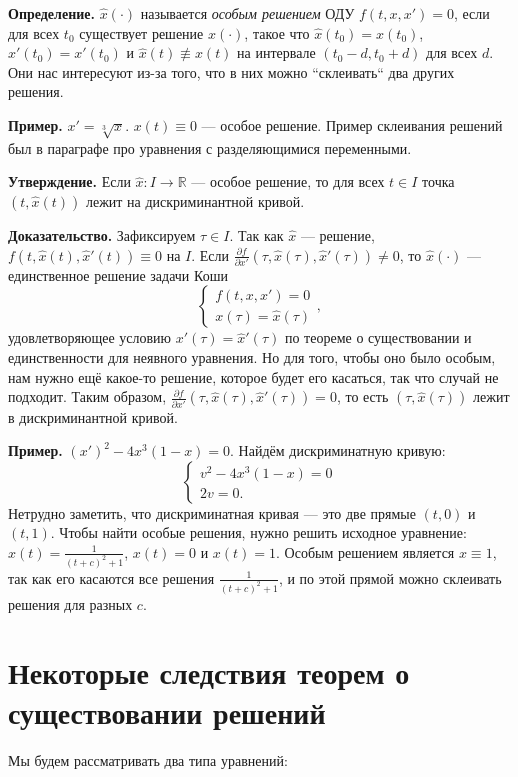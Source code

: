 \textbf{Определение.} $\widehat{x}(\cdot)$ называется \textit{особым решением} ОДУ $f(t, x, x') = 0$, если для всех $t_0$ существует решение $x(\cdot)$, такое что $\widehat{x}(t_0) = x(t_0)$, $\widehat{x}'(t_0) = x'(t_0)$ и $\widehat{x}(t) \not\equiv x(t)$ на интервале $(t_0 - d, t_0 + d)$ для всех $d$.
Они нас интересуют из-за того, что в них можно ``склеивать`` два других решения.

\textbf{Пример.} $x' = \sqrt[3]{x}$. $x(t) \equiv 0$ --- особое решение.
Пример склеивания решений был в параграфе про уравнения с разделяющимися переменными.

\textbf{Утверждение.} Если $\widehat{x}: I \to \mathbb R$ --- особое решение, то для всех $t \in I$ точка $(t, \widehat{x}(t))$ лежит на дискриминантной кривой.

\textbf{Доказательство.} Зафиксируем $\tau \in I$. Так как $\widehat x$ --- решение, $f(t, \widehat x(t), \widehat x'(t)) \equiv 0$ на $I$.
Если $\frac{\partial f}{\partial x'} (\tau, \widehat x(\tau), \widehat x'(\tau)) \ne 0$, то $\widehat x(\cdot)$ --- единственное решение задачи Коши
\[
    \begin{cases}
        f(t, x, x') = 0 \\
        x(\tau) = \widehat x(\tau)
    \end{cases},
\]
удовлетворяющее условию $x'(\tau) = \widehat x'(\tau)$ по теореме о существовании и единственности для неявного уравнения.
Но для того, чтобы оно было особым, нам нужно ещё какое-то решение, которое будет его касаться, так что случай не подходит.
Таким образом, $\frac{\partial f}{\partial x'} (\tau, \widehat x(\tau), \widehat x'(\tau)) = 0$, то есть $(\tau, \widehat x(\tau))$ лежит в дискриминантной кривой.

\QED

\textbf{Пример.} $(x')^2 - 4x^3(1-x) = 0$.
Найдём дискриминатную кривую:
\[
    \begin{cases}
        v^2 - 4x^3(1-x) = 0 \\
        2v = 0.
    \end{cases}
\]
Нетрудно заметить, что дискриминатная кривая --- это две прямые $(t, 0)$ и $(t, 1)$.
Чтобы найти особые решения, нужно решить исходное уравнение: $x(t) = \frac{1}{(t + c)^2 + 1}$, $x(t) = 0$ и $x(t) = 1$.
Особым решением является $x \equiv 1$, так как его касаются все решения $\frac{1}{(t + c)^2 + 1}$, и по этой прямой можно склеивать решения для разных $c$.

\section{Некоторые следствия теорем о существовании решений}
Мы будем рассматривать два типа уравнений:

